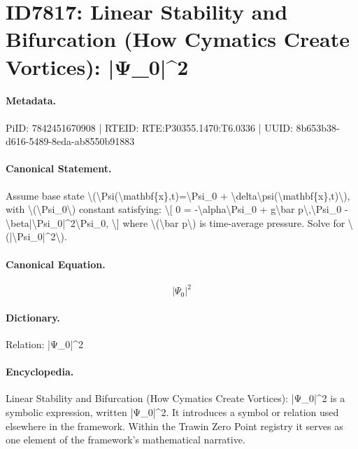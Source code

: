 \section*{ID7817: Linear Stability and Bifurcation (How Cymatics Create Vortices): |Ψ\_0|\textasciicircum{}2}
\paragraph{Metadata.}
PiID: 7842451670908 | RTEID: RTE:P30355.1470:T6.0336 | UUID: 8b653b38-d616-5489-8eda-ab8550b91883

\paragraph{Canonical Statement.}
Assume base state \textbackslash{}(\textbackslash{}Psi(\textbackslash{}mathbf\{x\},t)=\textbackslash{}Psi\_0 + \textbackslash{}delta\textbackslash{}psi(\textbackslash{}mathbf\{x\},t)\textbackslash{}), with \textbackslash{}(\textbackslash{}Psi\_0\textbackslash{}) constant satisfying: \textbackslash{}[ 0 = -\textbackslash{}alpha\textbackslash{}Psi\_0 + g\textbackslash{}bar p\textbackslash{},\textbackslash{}Psi\_0 - \textbackslash{}beta|\textbackslash{}Psi\_0|\textasciicircum{}2\textbackslash{}Psi\_0, \textbackslash{}] where \textbackslash{}(\textbackslash{}bar p\textbackslash{}) is time-average pressure. Solve for \textbackslash{}(|\textbackslash{}Psi\_0|\textasciicircum{}2\textbackslash{}).

\paragraph{Canonical Equation.}
\[
|\Psi_0|^2
\]

\paragraph{Dictionary.}
Relation: |Ψ\_0|\textasciicircum{}2

\paragraph{Encyclopedia.}
Linear Stability and Bifurcation (How Cymatics Create Vortices): |Ψ\_0|\textasciicircum{}2 is a symbolic expression, written |Ψ\_0|\textasciicircum{}2. It introduces a symbol or relation used elsewhere in the framework. Within the Trawin Zero Point registry it serves as one element of the framework's mathematical narrative.
